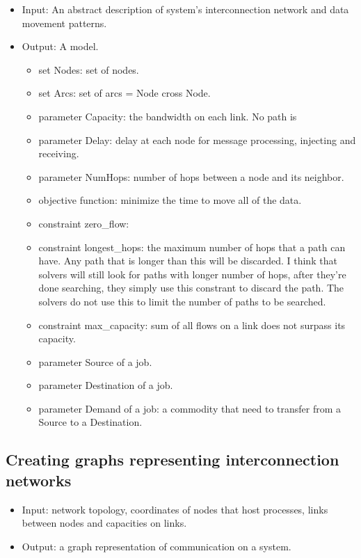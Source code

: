 \documentclass[letter]{article}
\begin{document}
\begin{itemize}
\item Input: An abstract description of system's interconnection network and data movement patterns.
\item Output: A model.
\begin{itemize}
\item set Nodes: set of nodes.
\item set Arcs: set of arcs = Node cross Node.
\item parameter Capacity: the bandwidth on each link. No path is 
\item parameter Delay: delay at each node for message processing, injecting and receiving.
\item parameter NumHops: number of hops between a node and its neighbor.
\item objective function: minimize the time to move all of the data.
\item constraint zero\_flow: 
\item constraint longest\_hops: the maximum number of hops that a path can have. Any path that is longer than this will be discarded. I think that solvers will still look for paths with longer number of hops, after they're done searching, they simply use this constrant to discard the path. The solvers do not use this to limit the number of paths to be searched.
\item constraint max\_capacity: sum of all flows on a link does not surpass its capacity.
\item parameter Source of a job.
\item parameter Destination of a job.
\item parameter Demand of a job: a commodity that need to transfer from a Source to a Destination.
\end{itemize}
\end{itemize}

\subsection {Creating graphs representing interconnection networks}
\begin{itemize}
\item Input: network topology, coordinates of nodes that host processes, links between nodes and capacities on links.
\item Output: a graph representation of communication on a system.
\end{itemize}
\end{document}
